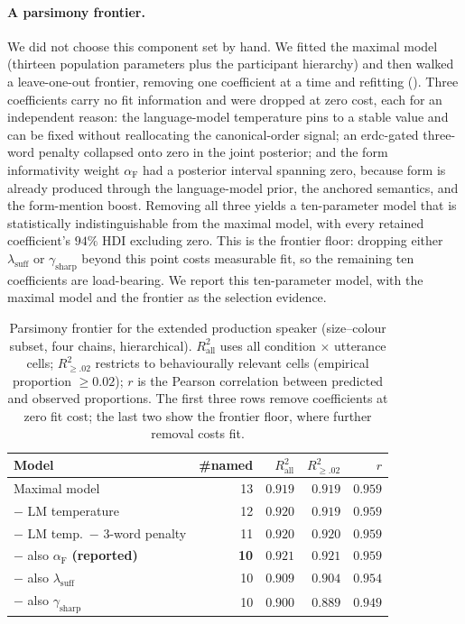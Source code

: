 \documentclass[man,floatsintext]{apa7}
\begin{document}
\paragraph{A parsimony frontier.}
We did not choose this component set by hand.
We fitted the maximal model (thirteen population parameters plus the participant hierarchy) and then walked a leave-one-out frontier, removing one coefficient at a time and refitting ().
Three coefficients carry no fit information and were dropped at zero cost, each for an independent reason: the language-model temperature pins to a stable value and can be fixed without reallocating the canonical-order signal; an erdc-gated three-word penalty collapsed onto zero in the joint posterior; and the form informativity weight $\alpha_\text{F}$ had a posterior interval spanning zero, because form is already produced through the language-model prior, the anchored semantics, and the form-mention boost.
Removing all three yields a ten-parameter model that is statistically indistinguishable from the maximal model, with every retained coefficient's $94\%$ HDI excluding zero.
This is the frontier floor: dropping either $\lambda_\text{suff}$ or $\gamma_\text{sharp}$ beyond this point costs measurable fit, so the remaining ten coefficients are load-bearing.
We report this ten-parameter model, with the maximal model and the frontier as the selection evidence.

\begin{table}[htbp]
\centering
\caption{Parsimony frontier for the extended production speaker (size--colour subset, four chains, hierarchical).
$R^2_{\text{all}}$ uses all condition $\times$ utterance cells; $R^2_{\ge.02}$ restricts to behaviourally relevant cells (empirical proportion $\ge 0.02$); $r$ is the Pearson correlation between predicted and observed proportions.
The first three rows remove coefficients at zero fit cost; the last two show the frontier floor, where further removal costs fit.}
\label{tab:parsimony-frontier}
\small
\begin{tabular}{lrrrr}
\hline
Model & \#named & $R^2_{\text{all}}$ & $R^2_{\ge.02}$ & $r$ \\
\hline
Maximal model & 13 & $0.919$ & $0.919$ & $0.959$ \\
\quad $-$ LM temperature & 12 & $0.920$ & $0.919$ & $0.959$ \\
\quad $-$ LM temp.\ $-$ 3-word penalty & 11 & $0.920$ & $0.920$ & $0.959$ \\
\quad $-$ also $\alpha_\text{F}$ \textbf{(reported)} & \textbf{10} & $\mathbf{0.921}$ & $\mathbf{0.921}$ & $\mathbf{0.959}$ \\
\quad\quad $-$ also $\lambda_\text{suff}$ & 10 & $0.909$ & $0.904$ & $0.954$ \\
\quad\quad $-$ also $\gamma_\text{sharp}$ & 10 & $0.900$ & $0.889$ & $0.949$ \\
\hline
\end{tabular}
\end{table}
\end{document}
